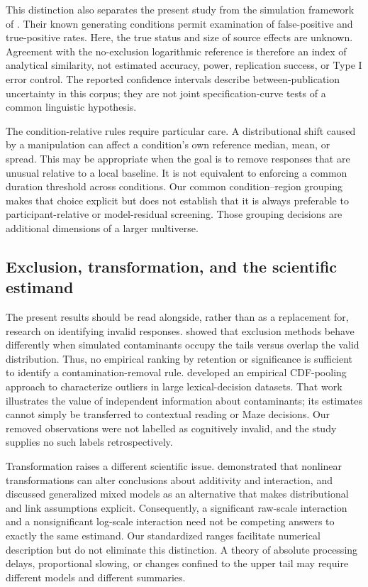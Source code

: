This distinction also separates the present study from the simulation
framework of \citet{bognar_multiverse_2025}. Their known generating
conditions permit examination of false-positive and true-positive rates.
Here, the true status and size of source effects are unknown. Agreement
with the no-exclusion logarithmic reference is therefore an index of
analytical similarity, not estimated accuracy, power, replication success,
or Type I error control. The reported confidence intervals describe
between-publication uncertainty in this corpus; they are not joint
specification-curve tests of a common linguistic hypothesis.

The condition-relative rules require particular care. A distributional
shift caused by a manipulation can affect a condition's own reference
median, mean, or spread. This may be appropriate when the goal is to remove
responses that are unusual relative to a local baseline. It is not
equivalent to enforcing a common duration threshold across conditions.
Our common condition--region grouping makes that choice explicit but
does not establish that it is always preferable to participant-relative
or model-residual screening. Those grouping decisions are additional
dimensions of a larger multiverse.

\subsection{Exclusion, transformation, and the scientific estimand}

The present results should be read alongside, rather than as a replacement
for, research on identifying invalid responses. \citet{berger_outliers_2021}
showed that exclusion methods behave differently when simulated contaminants
occupy the tails versus overlap the valid distribution. Thus, no empirical
ranking by retention or significance is sufficient to identify a
contamination-removal rule. \citet{miller_pooling_2024} developed an empirical
CDF-pooling approach to characterize outliers in large lexical-decision
datasets. That work illustrates the value of independent information about
contaminants; its estimates cannot simply be transferred to contextual
reading or Maze decisions. Our removed observations were not labelled as
cognitively invalid, and the study supplies no such labels retrospectively.

Transformation raises a different scientific issue. \citet{lo_transform_2015}
demonstrated that nonlinear transformations can alter conclusions about
additivity and interaction, and discussed generalized mixed models as an
alternative that makes distributional and link assumptions explicit.
Consequently, a significant raw-scale interaction and a nonsignificant
log-scale interaction need not be competing answers to exactly the same
estimand. Our standardized ranges facilitate numerical description but
do not eliminate this distinction. A theory of absolute processing
delays, proportional slowing, or changes confined to the upper tail may
require different models and different summaries.

